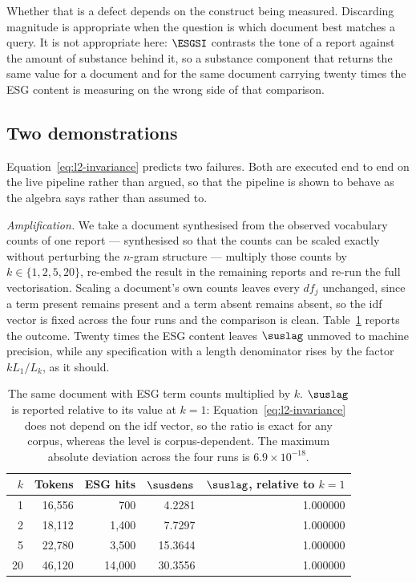 Whether that is a defect depends on the construct being measured. Discarding magnitude is
appropriate when the question is which document best matches a query. It is not appropriate
here: $\ESGSI$ contrasts the tone of a report against the amount of substance behind it, so
a substance component that returns the same value for a document and for the same document
carrying twenty times the ESG content is measuring on the wrong side of that comparison.

\subsection{Two demonstrations}

Equation~\eqref{eq:l2-invariance} predicts two failures. Both are executed end to end on the
live pipeline rather than argued, so that the pipeline is shown to behave as the algebra
says rather than assumed to.

\emph{Amplification.} We take a document synthesised from the observed vocabulary counts of
one report --- synthesised so that the counts can be scaled exactly without perturbing the
$n$-gram structure --- multiply those counts by $k \in \{1, 2, 5, 20\}$, re-embed the result
in the remaining reports and re-run the full vectorisation. Scaling a document's own counts
leaves every $df_j$ unchanged, since a term present remains present and a term absent remains
absent, so the idf vector is fixed across the four runs and the comparison is clean.
Table~\ref{tab:measurement-scaling} reports the outcome. Twenty times the ESG content leaves
$\suslag$ unmoved to machine precision, while any specification with a length denominator
rises by the factor $k L_1 / L_k$, as it should.

\begin{table}[ht]
\centering
\caption{The same document with ESG term counts multiplied by $k$. $\suslag$ is reported
relative to its value at $k = 1$: Equation~\eqref{eq:l2-invariance} does not depend on the idf
vector, so the ratio is exact for any corpus, whereas the level is corpus-dependent. The
maximum absolute deviation across the four runs is $6.9 \times 10^{-18}$.}
\label{tab:measurement-scaling}
\begin{tabular}{rrrrr}
\toprule
$k$ & Tokens & ESG hits & $\susdens$ & $\suslag$, relative to $k=1$ \\
\midrule
1  & 16{,}556 & 700      & 4.2281  & 1.000000 \\
2  & 18{,}112 & 1{,}400  & 7.7297  & 1.000000 \\
5  & 22{,}780 & 3{,}500  & 15.3644 & 1.000000 \\
20 & 46{,}120 & 14{,}000 & 30.3556 & 1.000000 \\
\bottomrule
\end{tabular}
\end{table}

